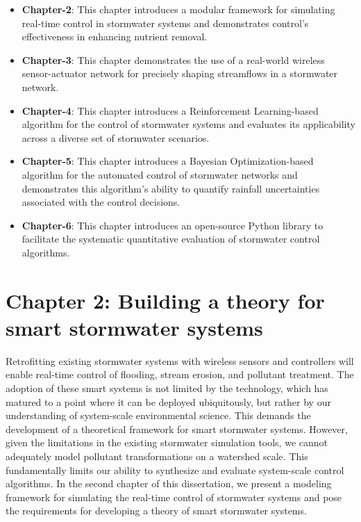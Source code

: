 \begin{itemize}
	\item \textbf{Chapter-2}: This chapter introduces a modular framework for simulating real-time control in stormwater systems and demonstrates control's effectiveness in enhancing nutrient removal.
	\item \textbf{Chapter-3}: This chapter demonstrates the use of a real-world wireless sensor-actuator network for precisely shaping streamflows in a stormwater network.
	\item \textbf{Chapter-4}: This chapter introduces a Reinforcement Learning-based algorithm for the control of stormwater systems and evaluates its applicability across a diverse set of stormwater scenarios.
	\item \textbf{Chapter-5}: This chapter introduces a Bayesian Optimization-based algorithm for the automated control of stormwater networks and demonstrates this algorithm's ability to quantify rainfall uncertainties associated with the control decisions. 
	\item \textbf{Chapter-6}: This chapter introduces an open-source Python library to facilitate the systematic quantitative evaluation of stormwater control algorithms.
\end{itemize}
 

\section{Chapter 2: Building a theory for smart stormwater systems}

Retrofitting existing stormwater systems with wireless sensors and controllers will enable real-time control of flooding, stream erosion, and pollutant treatment. 
The adoption of these smart systems is not limited by the technology, which has matured to a point where it can be deployed ubiquitously, but rather by our understanding of system-scale environmental science.
This demands the development of a theoretical framework for smart stormwater systems.
However, given the limitations in the existing stormwater simulation tools, we cannot adequately model pollutant transformations on a watershed scale.
This fundamentally limits our ability to synthesize and evaluate system-scale control algorithms. 
In the second chapter of this dissertation, we present a modeling framework for simulating the real-time control of stormwater systems and pose the requirements for developing a theory of smart stormwater systems.

\

